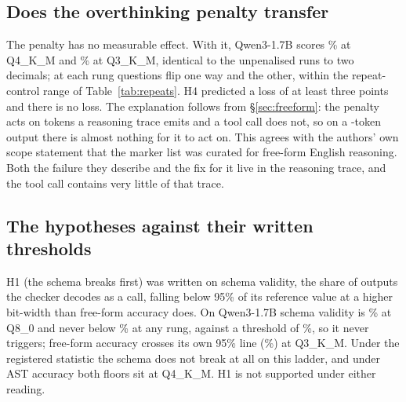 \documentclass[12pt,letterpaper]{article}
\newcommand{\bfcl}{BFCL}
\newcommand{\qm}{Qwen3-1.7B}
\begin{document}
\begin{table}[t]
\centering\scriptsize\setlength{\tabcolsep}{3pt}

\caption{Multi-turn tool calling, \bfcl{} \texttt{multi\_turn\_base}, \qm{}, $n=\qtMtN{}$ per rung (the whole category), one run. Accuracy over all trajectories, with Wilson 95\% intervals, as \bfcl{} scores it; McNemar's $p$ against Q8\_0 with the Holm-adjusted value in brackets. Aborted counts trajectories that ended in a server context error or a handler exception and were scored as failures; the last column is the accuracy on the trajectories that ran to completion. The rung comparison is confounded by the aborts (\S\ref{sec:multiturn}).}
\label{tab:multiturn}
\end{table}

\subsection{Does the overthinking penalty transfer}
\label{sec:penalty}

The penalty has no measurable effect. With it, \qm{} scores \qtHfourAccFour{}\% at Q4\_K\_M and \qtHfourAccThree{}\% at Q3\_K\_M, identical to the unpenalised runs to two decimals; at each rung \qtHfourLostFour{} questions flip one way and \qtHfourGainedFour{} the other, within the repeat-control range of Table~\ref{tab:repeats}. H4 predicted a loss of at least three points and there is no loss. The explanation follows from \S\ref{sec:freeform}: the penalty acts on tokens a reasoning trace emits and a tool call does not, so on a \qtToolNgenMedThree{}-token output there is almost nothing for it to act on. This agrees with the authors' own scope statement that the marker list was curated for free-form English reasoning. Both the failure they describe and the fix for it live in the reasoning trace, and the tool call contains very little of that trace.

\subsection{The hypotheses against their written thresholds}
\label{sec:hyp}

H1 (the schema breaks first) was written on schema validity, the share of outputs the checker decodes as a call, falling below 95\% of its reference value at a higher bit-width than free-form accuracy does. On \qm{} schema validity is \qtSchemaValidEight{}\% at Q8\_0 and never below \qtHoneSchemaMin{}\% at any rung, against a threshold of \qtHoneSchemaThresh{}\%, so it never triggers; free-form accuracy crosses its own 95\% line (\qtHoneGsmThresh{}\%) at Q3\_K\_M. Under the registered statistic the schema does not break at all on this ladder, and under AST accuracy both floors sit at Q4\_K\_M. H1 is not supported under either reading.
\end{document}
